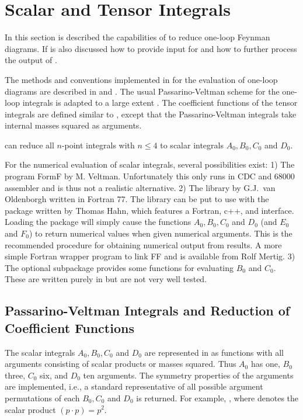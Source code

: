 \section{Scalar and Tensor Integrals}

In this section is described the capabilities of \fc to reduce one-loop Feynman diagrams.
If is also discussed how to provide input for \fc and how to further process the output of \fc.

The methods and conventions implemented in \fc for the evaluation of one-loop diagrams are
described in \cite{ansgar} and \cite{feyncalc}. The usual Passarino-Veltman scheme for the
one-loop integrals is adapted to a large extent \cite{ansgar}.  The coefficient functions of the
tensor integrals are defined  similar to \cite{ansgar}, except that the Passarino-Veltman
integrals take internal masses squared  as arguments.

\fc can reduce all $n$-point integrals with $n\leq 4$ to scalar integrals $A_0, B_0, C_0$ and
$D_0$.

For the numerical evaluation of scalar integrals, several possibilities exist: 1) The program
FormF by M. Veltman. Unfortunately this only runs in CDC and 68000 assembler and is thus not a
realistic alternative. 2) The library \FF by G.J.~van Oldenborgh \cite{Ol91} written in Fortran
77. The library can be put to use with the \lpts package \cite{Hahn:1998yk} written by Thomas
Hahn, which features a Fortran, c++, and \mma interface. Loading the \mma package will simply
cause the functions $A_0, B_0, C_0$ and $D_0$ (and $E_0$ and $F_0$) to return numerical values
when given numerical arguments. This is the recommended procedure for obtaining numerical output
from \fc results. A more simple Fortran wrapper program to link FF and \fc is available from Rolf
Mertig. 3) The optional subpackage \fphi provides some functions for evaluating $B_0$ and $C_0$.
These are written purely in \mma but are not very well tested.

\subsection{Passarino-Veltman Integrals and Reduction of Coefficient Functions}
\label{passvelt}

The scalar integrals $A_0, B_0, C_0$ and $D_0$ are represented
in \fc as functions with all arguments consisting of scalar products or 
masses squared. Thus $A_0$ has one, $B_0$ three, $C_0$ six, and 
$D_0$ ten arguments. The symmetry properties of the arguments  are 
implemented, i.e., a standard representative of all possible 
argument permutations of each $ B_0, C_0$ and $D_0$ is returned.
For example,  \ra {}, where 
 denotes the scalar product $(p\cdot p) = p^2$.

